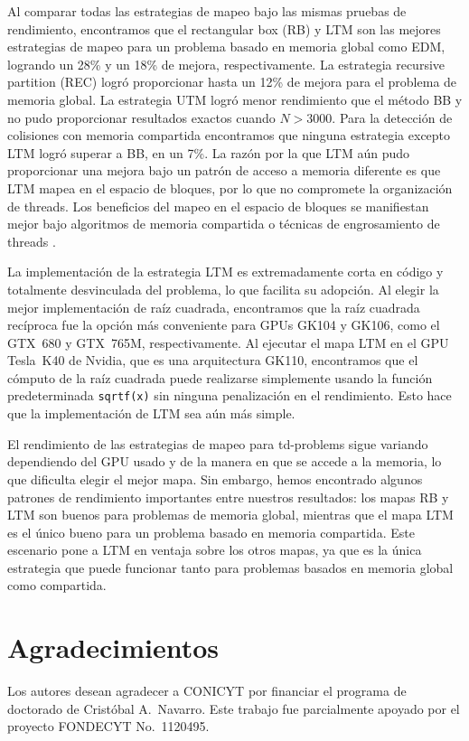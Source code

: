 \documentclass[twocolumn,10pt,a4paper]{article}
\begin{document}
Al comparar todas las estrategias de mapeo bajo las mismas pruebas de
rendimiento, encontramos que el rectangular box (RB) y LTM son las mejores
estrategias de mapeo para un problema basado en memoria global como EDM,
logrando un 28\% y un 18\% de mejora, respectivamente. La estrategia
recursive partition (REC) logró proporcionar hasta un 12\% de mejora para el
problema de memoria global. La estrategia UTM logró menor rendimiento que el
método BB y no pudo proporcionar resultados exactos cuando $N > 3000$. Para
la detección de colisiones con memoria compartida encontramos que ninguna
estrategia excepto LTM logró superar a BB, en un 7\%. La razón por la que
LTM aún pudo proporcionar una mejora bajo un patrón de acceso a memoria
diferente es que LTM mapea en el espacio de bloques, por lo que no compromete
la organización de threads. Los beneficios del mapeo en el espacio de bloques
se manifiestan mejor bajo algoritmos de memoria compartida o técnicas de
engrosamiento de threads \cite{ref13}.

La implementación de la estrategia LTM es extremadamente corta en código y
totalmente desvinculada del problema, lo que facilita su adopción. Al elegir
la mejor implementación de raíz cuadrada, encontramos que la raíz cuadrada
recíproca fue la opción más conveniente para GPUs GK104 y GK106, como el
GTX~680 y GTX~765M, respectivamente. Al ejecutar el mapa LTM en el GPU
Tesla~K40 de Nvidia, que es una arquitectura GK110, encontramos que el cómputo
de la raíz cuadrada puede realizarse simplemente usando la función predeterminada
\texttt{sqrtf(x)} sin ninguna penalización en el rendimiento. Esto hace que la
implementación de LTM sea aún más simple.

El rendimiento de las estrategias de mapeo para td-problems sigue variando
dependiendo del GPU usado y de la manera en que se accede a la memoria, lo que
dificulta elegir el mejor mapa. Sin embargo, hemos encontrado algunos patrones
de rendimiento importantes entre nuestros resultados: los mapas RB y LTM son
buenos para problemas de memoria global, mientras que el mapa LTM es el único
bueno para un problema basado en memoria compartida. Este escenario pone a LTM
en ventaja sobre los otros mapas, ya que es la única estrategia que puede
funcionar tanto para problemas basados en memoria global como compartida.

\section*{Agradecimientos}

Los autores desean agradecer a CONICYT por financiar el programa de doctorado
de Crist\'obal A.\ Navarro. Este trabajo fue parcialmente apoyado por el
proyecto FONDECYT No.\ 1120495.




\end{document}

